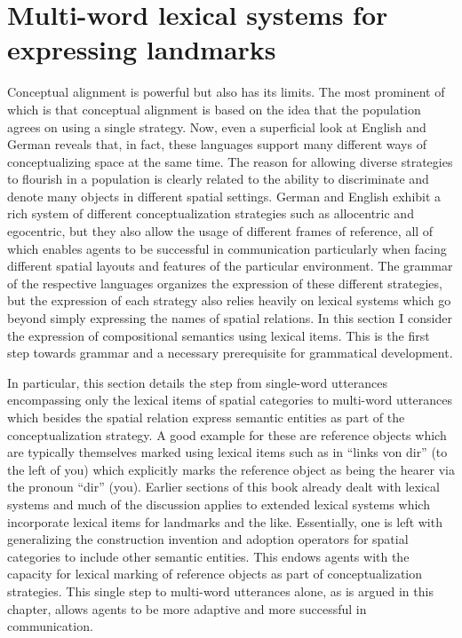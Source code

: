 % 

\chapter{Multi-word lexical systems for expressing landmarks}
\label{s:multi-word}
Conceptual alignment is powerful but also has its limits. The most prominent of which
is that conceptual alignment is based on the idea that the population agrees on using a 
single strategy. Now, even a superficial look at English and German reveals that, in fact, 
these languages support many different ways of conceptualizing space at the same time. 
The reason for allowing diverse strategies to flourish in a population is clearly related to 
the ability to discriminate and denote many objects in different spatial settings.
German and English exhibit a rich system of different conceptualization
strategies such as allocentric and egocentric, but they also allow the usage of different frames of reference,
all of which enables agents to be successful in communication particularly when facing different spatial layouts 
and features of the particular environment. The grammar of the respective languages organizes
the expression of these different strategies, but the expression of each strategy also relies heavily on 
lexical systems which go beyond simply expressing the names of spatial relations. 
In this section I consider the expression of compositional semantics using lexical items. 
This is the first step towards grammar and a necessary prerequisite for grammatical development. 

In particular, this section details the step from single-word utterances encompassing only the lexical 
items of spatial categories to multi-word utterances which besides the spatial relation express 
semantic entities as part of the conceptualization strategy. A good example for these are
reference objects which are typically themselves marked using lexical items such as 
in ``links von dir'' (to the left of you) which explicitly marks the reference object as being
the hearer via the pronoun ``dir'' (you). Earlier sections of this book already 
dealt with lexical systems and much of the discussion applies to extended lexical systems which 
incorporate lexical items for landmarks and the like. Essentially, one is 
left with generalizing the construction invention and adoption operators for spatial 
categories to include other semantic entities. This endows agents with the capacity for lexical marking 
of reference objects as part of conceptualization strategies. This single step to 
multi-word utterances alone, as is argued in this chapter, allows agents to be 
more adaptive and more successful in communication.

